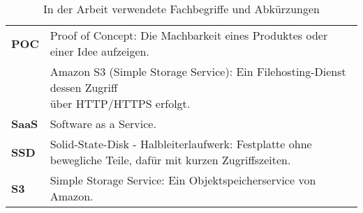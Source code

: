\begin{table}[!htbp]
\begin{tabular}{p{}p{}}
	\textbf{POC} & Proof of Concept: Die Machbarkeit eines Produktes oder einer Idee aufzeigen.\\
	\makecell[l]{\textbf{S3}} & \makecell[l]{Amazon S3 (Simple Storage Service): Ein Filehosting-Dienst dessen Zugriff\\ über HTTP/HTTPS erfolgt.}\\
	\textbf{SaaS} & Software as a Service.\\
	\textbf{SSD} &  Solid-State-Disk - Halbleiterlaufwerk: Festplatte ohne bewegliche Teile, dafür mit kurzen Zugriffszeiten.\\
	\textbf{S3} & Simple Storage Service: Ein Objektspeicherservice von Amazon.\\
\end{tabular}
\caption{\label{tab:fachbegriffe}In der Arbeit verwendete Fachbegriffe und Abkürzungen}
\end{table}